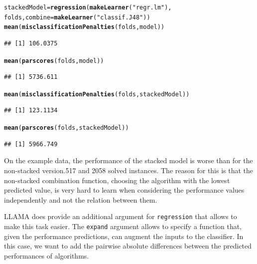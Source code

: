 \documentclass{article}\usepackage[]{graphicx}\usepackage[]{color}
\makeatletter
\newcommand{\hlstr}[1]{\textcolor[rgb]{0.192,0.494,0.8}{#1}}%
\newcommand{\hlstd}[1]{\textcolor[rgb]{0.345,0.345,0.345}{#1}}%
\newcommand{\hlkwb}[1]{\textcolor[rgb]{0.69,0.353,0.396}{#1}}%
\newcommand{\hlkwc}[1]{\textcolor[rgb]{0.333,0.667,0.333}{#1}}%
\newcommand{\hlkwd}[1]{\textcolor[rgb]{0.737,0.353,0.396}{\textbf{#1}}}%
\newenvironment{kframe}{%
 \def\at@end@of@kframe{}%
 \ifinner\ifhmode%
  \def\at@end@of@kframe{\end{minipage}}%
  \begin{minipage}{\columnwidth}%
 \fi\fi%
 \def\FrameCommand##1{\hskip\@totalleftmargin \hskip-\fboxsep
 \colorbox{shadecolor}{##1}\hskip-\fboxsep
     \hskip-\linewidth \hskip-\@totalleftmargin \hskip\columnwidth}%
 \MakeFramed {\advance\hsize-\width
   \@totalleftmargin\z@ \linewidth\hsize
   \@setminipage}}%
 {\par\unskip\endMakeFramed%
 \at@end@of@kframe}
\newenvironment{knitrout}{}{} %
\makeatother
\begin{document}
\begin{knitrout}
\color{fgcolor}\begin{kframe}
\begin{alltt}
\hlstd{stackedModel} \hlkwb{=} \hlkwd{regression}\hlstd{(}\hlkwd{makeLearner}\hlstd{(}\hlstr{"regr.lm"}\hlstd{),}
    \hlstd{folds,} \hlkwc{combine} \hlstd{=} \hlkwd{makeLearner}\hlstd{(}\hlstr{"classif.J48"}\hlstd{))}
\hlkwd{mean}\hlstd{(}\hlkwd{misclassificationPenalties}\hlstd{(folds, model))}
\end{alltt}
\begin{verbatim}
## [1] 106.0375
\end{verbatim}
\begin{alltt}
\hlkwd{mean}\hlstd{(}\hlkwd{parscores}\hlstd{(folds, model))}
\end{alltt}
\begin{verbatim}
## [1] 5736.611
\end{verbatim}
\begin{alltt}
\hlkwd{mean}\hlstd{(}\hlkwd{misclassificationPenalties}\hlstd{(folds, stackedModel))}
\end{alltt}
\begin{verbatim}
## [1] 123.1134
\end{verbatim}
\begin{alltt}
\hlkwd{mean}\hlstd{(}\hlkwd{parscores}\hlstd{(folds, stackedModel))}
\end{alltt}
\begin{verbatim}
## [1] 5966.749
\end{verbatim}
\end{kframe}
\end{knitrout}

On the example data, the performance of the stacked model is worse than for the
non-stacked version.517 and 2058 solved instances. The reason for this is that
the non-stacked combination function, choosing the algorithm with the lowest
predicted value, is very hard to learn when considering the performance values
independently and not the relation between them.

LLAMA does provide an additional argument for \lstinline{regression} that allows
to make this task easier. The \lstinline{expand} argument allows to specify a
function that, given the performance predictions, can augment the inputs to the
classifier. In this case, we want to add the pairwise absolute differences
between the predicted performances of algorithms.
\end{document}
